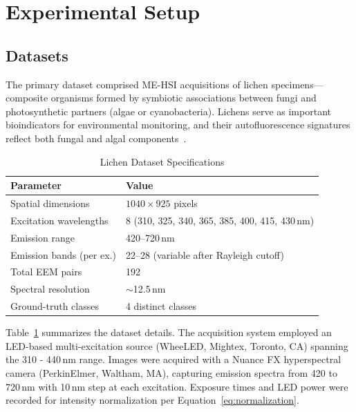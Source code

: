 \section{Experimental Setup}
\label{sec:experimental_setup}

\subsection{Datasets}
\label{sec:datasets}

The primary dataset comprised ME-HSI acquisitions of lichen specimens---composite organisms formed by symbiotic associations between fungi and photosynthetic partners (algae or cyanobacteria).
Lichens serve as important bioindicators for environmental monitoring, and their autofluorescence signatures reflect both fungal and algal components~\cite{meysurova2021optical}.

\begin{table}[!t]
\centering
\caption{Lichen Dataset Specifications}
\label{tab:dataset}
\begin{tabular}{@{}ll@{}}
\toprule
\textbf{Parameter} & \textbf{Value} \\
\midrule
Spatial dimensions & $1040 \times 925$ pixels \\
Excitation wavelengths & 8 (310, 325, 340, 365, 385, 400, 415, 430\,nm) \\
Emission range & 420--720\,nm \\
Emission bands (per ex.) & 22--28 (variable after Rayleigh cutoff) \\
Total EEM pairs & 192 \\
Spectral resolution & $\sim$12.5\,nm \\
Ground-truth classes & 4 distinct classes \\
\bottomrule
\end{tabular}
\end{table}

Table~\ref{tab:dataset} summarizes the dataset details.
The acquisition system employed an LED-based multi-excitation source (WheeLED, Mightex, Toronto, CA) spanning the 310 - 440\,nm range. Images were acquired with a Nuance FX hyperspectral camera (PerkinElmer, Waltham, MA), capturing emission spectra from 420 to 720\,nm with 10\,nm step at each excitation.
Exposure times and LED power were recorded for intensity normalization per Equation~\eqref{eq:normalization}.

